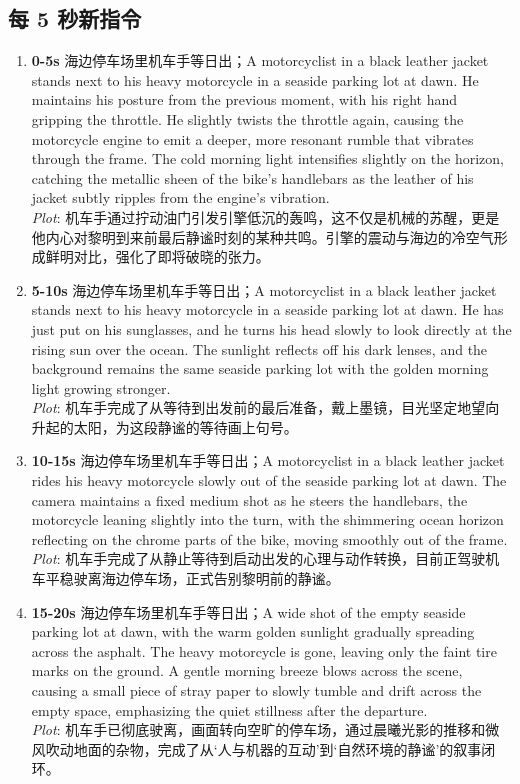 \documentclass[11pt,a4paper]{article}
\begin{document}
\subsection*{每 5 秒新指令}
\begin{enumerate}
\item \textbf{0-5s} 海边停车场里机车手等日出；A motorcyclist in a black leather jacket stands next to his heavy motorcycle in a seaside parking lot at dawn. He maintains his posture from the previous moment, with his right hand gripping the throttle. He slightly twists the throttle again, causing the motorcycle engine to emit a deeper, more resonant rumble that vibrates through the frame. The cold morning light intensifies slightly on the horizon, catching the metallic sheen of the bike's handlebars as the leather of his jacket subtly ripples from the engine's vibration.\\\newline \textit{Plot}: 机车手通过拧动油门引发引擎低沉的轰鸣，这不仅是机械的苏醒，更是他内心对黎明到来前最后静谧时刻的某种共鸣。引擎的震动与海边的冷空气形成鲜明对比，强化了即将破晓的张力。
\item \textbf{5-10s} 海边停车场里机车手等日出；A motorcyclist in a black leather jacket stands next to his heavy motorcycle in a seaside parking lot at dawn. He has just put on his sunglasses, and he turns his head slowly to look directly at the rising sun over the ocean. The sunlight reflects off his dark lenses, and the background remains the same seaside parking lot with the golden morning light growing stronger.\\\newline \textit{Plot}: 机车手完成了从等待到出发前的最后准备，戴上墨镜，目光坚定地望向升起的太阳，为这段静谧的等待画上句号。
\item \textbf{10-15s} 海边停车场里机车手等日出；A motorcyclist in a black leather jacket rides his heavy motorcycle slowly out of the seaside parking lot at dawn. The camera maintains a fixed medium shot as he steers the handlebars, the motorcycle leaning slightly into the turn, with the shimmering ocean horizon reflecting on the chrome parts of the bike, moving smoothly out of the frame.\\\newline \textit{Plot}: 机车手完成了从静止等待到启动出发的心理与动作转换，目前正驾驶机车平稳驶离海边停车场，正式告别黎明前的静谧。
\item \textbf{15-20s} 海边停车场里机车手等日出；A wide shot of the empty seaside parking lot at dawn, with the warm golden sunlight gradually spreading across the asphalt. The heavy motorcycle is gone, leaving only the faint tire marks on the ground. A gentle morning breeze blows across the scene, causing a small piece of stray paper to slowly tumble and drift across the empty space, emphasizing the quiet stillness after the departure.\\\newline \textit{Plot}: 机车手已彻底驶离，画面转向空旷的停车场，通过晨曦光影的推移和微风吹动地面的杂物，完成了从‘人与机器的互动’到‘自然环境的静谧’的叙事闭环。

\end{enumerate}
\end{document}
